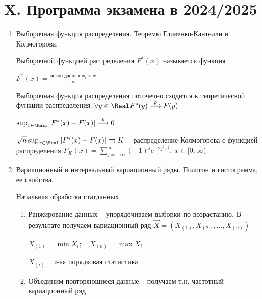 \clearpage

\section{X. Программа экзамена в 2024/2025}


\begin{enumerate}
    \item Выборочная функция распределения. Теоремы Гливенко-Кантелли и Колмогорова.

    \Def \hyperlink{selective_distribution_function}{Выборочной функцией распределения} $F^*(x)$ называется функция 
    
    $F^*(x) = \frac{\text{число данных } x_i < x}{n}$

    \begin{MyTheorem}
        \Ths Выборочная функция распределения поточечно сходится к теоретической функции распределения: 
        $\forall y \in \Real F^*(y) \overset{p}{\longrightarrow} F(y)$
    \end{MyTheorem}

    \begin{MyTheorem}
         $\sup_{x \in \Real} |F^*(x) - F(x)| \overset{p}{\longrightarrow} 0$
    \end{MyTheorem}

    \begin{MyTheorem}
         $\sqrt{n} \sup_{x \in \Real} |F^*(x) - F(x)| \rightrightarrows K$ -- распределение Колмогорова с 
        функцией распределения $F_K(x) = \sum_{j = -\infty}^{\infty} (-1)^j e^{-2 j^2 x^2}, \ x \in [0;\infty)$
    \end{MyTheorem}

    \item Вариационный и интервальный вариационный ряды. Полигон и гистограмма, ее свойства.

        
    \hyperlink{initial_data_processing}{Начальная обработка статданных}

    \begin{enumerate}
        \item Ранжирование данных -- упорядочиваем выборки по возрастанию. В результате получаем вариационный ряд $\vec{X} = (X_{(1)}, X_{(2)}, \dots, X_{(n)})$

        $X_{(1)} = \min X_i; \quad X_{(n)} = \max X_i$

        $X_{(i)} = i$-ая порядковая статистика

        \item Объединим повторяющиеся данные -- получаем т.н. частотный вариационный ряд


\end{enumerate}
\end{enumerate}
